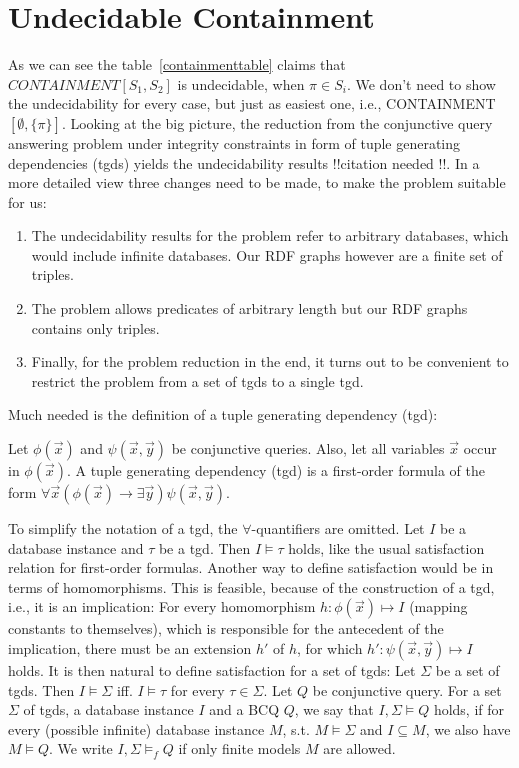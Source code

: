 \section{Undecidable Containment}
As we can see the table~\ref{containmenttable} claims that
$CONTAINMENT[S_1,S_2]$ is undecidable, when $\pi \in S_i$. We don't need to show
the undecidability for every case, but just as easiest one, i.e.,
CONTAINMENT$[\emptyset,\{\pi\}]$. Looking at the big picture, the reduction from the conjunctive query answering problem under integrity constraints in form of tuple generating
dependencies (tgds) yields the undecidability results !!citation needed !!. In a more detailed view
three changes need to be made, to make the problem suitable for us:
\begin{enumerate}
	\item  The undecidability results for the problem refer to arbitrary
		databases, which would include infinite databases. Our RDF graphs
		however are a finite set of triples.
	\item The problem allows predicates of arbitrary length but our RDF graphs
		contains only triples. 
	\item Finally, for the problem reduction in the end, it turns out to be
		convenient to restrict the problem from a set of tgds to a single tgd.
\end{enumerate}

Much needed is the definition of a tuple generating dependency (tgd):
\begin{definition}
	Let $\phi(\vec{x})$ and $\psi(\vec{x},\vec{y})$ be conjunctive queries.
	Also, let all variables $\vec{x}$ occur in $\phi(\vec{x})$.
	A tuple generating dependency (tgd) is a first-order formula of the form 
	$\forall \vec{x} (\phi(\vec{x}) \rightarrow \exists \vec{y})
	\psi(\vec{x},\vec{y})$.
\end{definition}
To simplify the notation of a tgd, the $\forall$-quantifiers are omitted.
Let $I$ be a database instance and $\tau$ be a tgd. Then $I \models \tau$ holds,
like the usual satisfaction relation for first-order formulas. Another way to
define satisfaction would be  in terms of homomorphisms. This is feasible,
because of the construction of a tgd, i.e., it is an implication:
For every homomorphism $h: \phi(\vec{x}) \mapsto I$ (mapping constants to
themselves), which is responsible for the antecedent of the implication, there
must be an extension $h'$ of $h$, for which $h':\psi(\vec{x},\vec{y}) \mapsto I$
holds. It is then natural to define satisfaction for a set of tgds: Let $\Sigma$
be a set of tgds. Then $I \models \Sigma$ iff. $I \models \tau$ for every $\tau
\in \Sigma$.
Let $Q$ be conjunctive query. For a set $\Sigma$ of tgds, a database instance
$I$ and a BCQ $Q$, we say that $I,\Sigma \models Q$ holds, if for every
(possible infinite) database instance $M$, s.t. $M \models \Sigma$ and $I
\subseteq M$, we also have $M \models Q$. We write $I, \Sigma \models_f Q$ if
only finite models $M$ are allowed.

